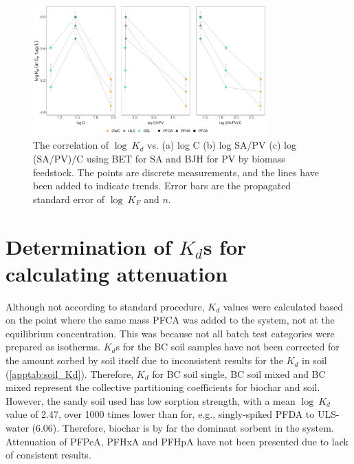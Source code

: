 \begin{figure}[htb]
    \centering
    \includegraphics[width=0.8\textwidth]{R/figs/SAPV_C_Kd1ugL_plot.pdf}
    \caption{The correlation of $\log~K_d$ vs. (a) log C (b) log SA/PV (c) log (SA/PV)/C using BET for SA and BJH for PV by biomass feedstock. The points are discrete measurements, and the lines have been added to indicate trends. Error bars are the propagated standard error of $\log~K_F$ and $n$.}
    \label{appfig:Kd_SAPV_C}
\end{figure}

\section{Determination of $K_d$s for calculating attenuation \label{appsec:attenuation}}
Although not according to standard procedure, $K_d$ values were calculated based on the point where the same mass PFCA was added to the system, not at the equilibrium concentration. This was because not all batch test categories were prepared as isotherms. $K_d$s for the BC soil samples have not been corrected for the amount sorbed by soil itself due to inconsistent results for the $K_d$ in soil (\cref{apptab:soil_Kd}). Therefore, $K_d$ for BC soil single, BC soil mixed and BC mixed represent the collective partitioning coefficients for biochar and soil. However, the sandy soil used has low sorption strength, with a mean $\log~K_d$ value of 2.47, over 1000 times lower than for, e.g., singly-spiked PFDA to ULS-water (6.06). Therefore, biochar is by far the dominant sorbent in the system. Attenuation of PFPeA, PFHxA and PFHpA have not been presented due to lack of consistent results. 

